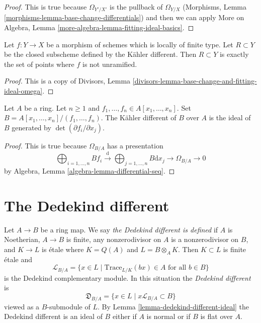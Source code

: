 \begin{proof}
This is true because $\Omega_{Y'/X'}$ is the pullback of $\Omega_{Y/X}$
(Morphisms, Lemma \ref{morphisms-lemma-base-change-differentials})
and then we can apply
More on Algebra, Lemma \ref{more-algebra-lemma-fitting-ideal-basics}.
\end{proof}

\begin{lemma}
\label{lemma-kahler-different}
Let $f : Y \to X$ be a morphism of schemes which is locally of finite type.
Let $R \subset Y$ be the closed subscheme defined by
the K\"ahler different. Then $R \subset Y$ is exactly
the set of points where $f$ is not unramified.
\end{lemma}

\begin{proof}
This is a copy of
Divisors, Lemma \ref{divisors-lemma-base-change-and-fitting-ideal-omega}.
\end{proof}

\begin{lemma}
\label{lemma-kahler-different-complete-intersection}
Let $A$ be a ring. Let $n \geq 1$ and
$f_1, \ldots, f_n \in A[x_1, \ldots, x_n]$.
Set $B = A[x_1, \ldots, x_n]/(f_1, \ldots, f_n)$.
The K\"ahler different of $B$ over $A$ is the ideal
of $B$ generated by $\det(\partial f_i/\partial x_j)$.
\end{lemma}

\begin{proof}
This is true because $\Omega_{B/A}$ has a presentation
$$
\bigoplus\nolimits_{i = 1, \ldots, n} B f_i
\xrightarrow{\text{d}}
\bigoplus\nolimits_{j = 1, \ldots, n} B \text{d}x_j
\rightarrow \Omega_{B/A} \rightarrow 0
$$
by Algebra, Lemma \ref{algebra-lemma-differential-seq}.
\end{proof}



\section{The Dedekind different}
\label{section-dedekind-different}

\noindent
Let $A \to B$ be a ring map. We say {\it the Dedekind different is defined}
if $A$ is Noetherian, $A \to B$ is finite,
any nonzerodivisor on $A$ is a nonzerodivisor on $B$, and $K \to L$ is
\'etale where $K = Q(A)$ and $L = B \otimes_A K$. Then $K \subset L$ is
finite \'etale and
$$
\mathcal{L}_{B/A} = \{x \in L \mid \text{Trace}_{L/K}(bx) \in A
\text{ for all }b \in B\}
$$
is the Dedekind complementary module. In this situation the
{\it Dedekind different} is
$$
\mathfrak{D}_{B/A} = \{x \in L \mid x\mathcal{L}_{B/A} \subset B\}
$$
viewed as a $B$-submodule of $L$.
By Lemma \ref{lemma-dedekind-different-ideal} the Dedekind different is an
ideal of $B$ either if $A$ is normal or if $B$ is flat over $A$.

